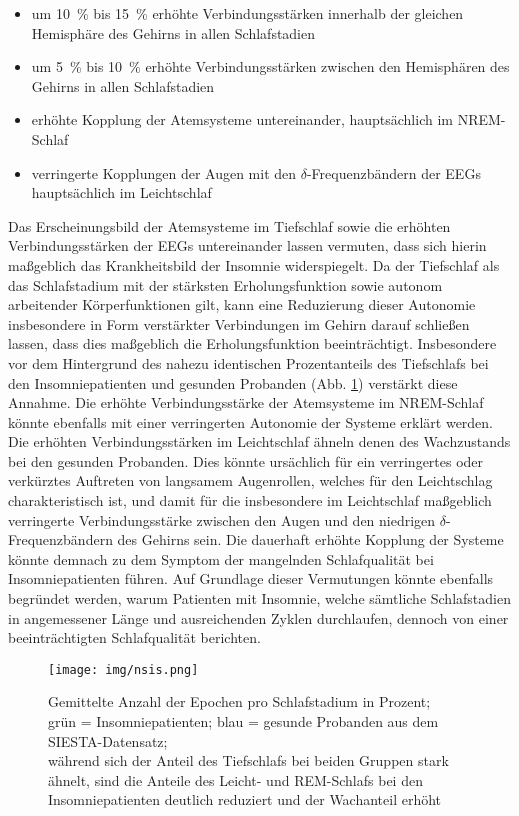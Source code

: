 \begin{itemize}
\item um 10~\% bis 15~\% erhöhte Verbindungsstärken innerhalb der gleichen Hemisphäre des Gehirns in allen Schlafstadien
\item um 5~\% bis 10~\% erhöhte Verbindungsstärken zwischen den Hemisphären des Gehirns in allen Schlafstadien
\item erhöhte Kopplung der Atemsysteme untereinander, hauptsächlich im \acs{NREM}-Schlaf
\item verringerte Kopplungen der Augen mit den $\delta$-Frequenzbändern der \acs{EEG}s hauptsächlich im Leichtschlaf
\end{itemize}

Das Erscheinungsbild der Atemsysteme im Tiefschlaf sowie die erhöhten Verbindungsstärken der \acs{EEG}s untereinander lassen vermuten, dass sich hierin maßgeblich das Krankheitsbild der Insomnie widerspiegelt. Da der Tiefschlaf als das Schlafstadium mit der stärksten Erholungsfunktion sowie autonom arbeitender Körperfunktionen gilt, kann eine Reduzierung dieser Autonomie insbesondere in Form verstärkter Verbindungen im Gehirn darauf schließen lassen, dass dies maßgeblich die Erholungsfunktion beeinträchtigt. Insbesondere vor dem Hintergrund des nahezu identischen Prozentanteils des Tiefschlafs bei den Insomniepatienten und gesunden Probanden (Abb. \ref{fig:nsis}) verstärkt diese Annahme. Die erhöhte Verbindungsstärke der Atemsysteme im \acs{NREM}-Schlaf könnte ebenfalls mit einer verringerten Autonomie der Systeme erklärt werden. Die erhöhten Verbindungsstärken im Leichtschlaf ähneln denen des Wachzustands bei den gesunden Probanden. Dies könnte ursächlich für ein verringertes oder verkürztes Auftreten von langsamem Augenrollen, welches für den Leichtschlag charakteristisch ist, und damit für die insbesondere im Leichtschlaf maßgeblich verringerte Verbindungsstärke zwischen den Augen und den niedrigen $\delta$-Frequenzbändern des Gehirns sein. Die dauerhaft erhöhte Kopplung der Systeme könnte demnach zu dem Symptom der mangelnden Schlafqualität bei Insomniepatienten führen. Auf Grundlage dieser Vermutungen könnte ebenfalls begründet werden, warum Patienten mit Insomnie, welche sämtliche Schlafstadien in angemessener Länge und ausreichenden Zyklen durchlaufen, dennoch von einer beeinträchtigten Schlafqualität berichten.

\begin{figure}[H]
	\centering
	\texttt{[image: img/nsis.png]}
	\caption[Epochen pro Schlafstadium]{Gemittelte Anzahl der Epochen pro Schlafstadium in Prozent;\\grün = Insomniepatienten; blau = gesunde Probanden aus dem SIESTA-Datensatz;\\während sich der Anteil des Tiefschlafs bei beiden Gruppen stark ähnelt, sind die Anteile des Leicht- und \acs{REM}-Schlafs bei den Insomniepatienten deutlich reduziert und der Wachanteil erhöht}
	\label{fig:nsis}
\end{figure}


